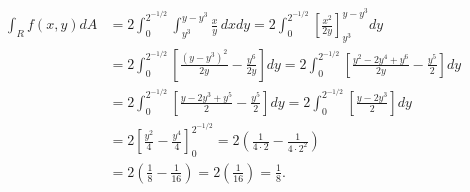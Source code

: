 \documentclass[
  a4paper,
]{scrreport}
\theoremstyle{definition}
\theoremstyle{remark}
\begin{document}
\begin{tcolorbox}
\begin{align*}
\int_R f(x,y) dA 
&= 2\int_0^{2^{-1/2}} \int_{y^3}^{y-y^3} \frac{x}{y} \,dx dy 
= 2\int_0^{2^{-1/2}} \left[ \frac{x^2}{2y} \right]_{y^3}^{y-y^3} dy \\
&= 2\int_0^{2^{-1/2}} \left[ \frac{(y-y^3)^2}{2y} - \frac{y^6}{2y} \right] dy 
= 2\int_0^{2^{-1/2}} \left[ \frac{y^2-2y^4+y^6}{2y} - \frac{y^5}{2} \right] dy \\
&= 2\int_0^{2^{-1/2}} \left[ \frac{y-2y^3+y^5}{2} - \frac{y^5}{2} \right] dy 
= 2\int_0^{2^{-1/2}} \left[ \frac{y-2y^3}{2} \right] dy \\
&= 2\left[ \frac{y^2}{4} - \frac{y^4}{4} \right]_0^{2^{-1/2}} 
= 2\left( \frac{1}{4\cdot 2} - \frac{1}{4\cdot 2^2}  \right) \\
&= 2\left( \frac{1}{8} - \frac{1}{16} \right) 
= 2\left( \frac{1}{16} \right) 
= \frac{1}{8}.
\end{align*}

\end{tcolorbox}
\end{document}
